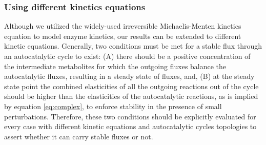     \subsubsection{Using different kinetics equations}
    Although we utilized the widely-used irreversible Michaelis-Menten kinetics equation to model enzyme kinetics, our results can be extended to different kinetic equations.
    Generally, two conditions must be met for a stable flux through an autocatalytic cycle to exist: (A) there should be a positive concentration of the intermediate metabolites for which the outgoing fluxes balance the autocatalytic fluxes, resulting in a steady state of fluxes, and, (B) at the steady state point the combined elasticities of all the outgoing reactions out of the cycle should be higher than the elasticities of the autocatalytic reactions, as is implied by equation \ref{eq:complex}, to enforce stability in the presence of small perturbations.
    Therefore, these two conditions should be explicitly evaluated for every case with different kinetic equations and autocatalytic cycles topologies to assert whether it can carry stable fluxes or not.

